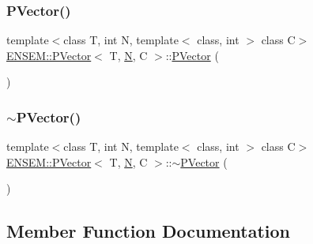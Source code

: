 \mbox{\label{classENSEM_1_1PVector_afc5f971e6ec88789c8205b2e03b1edfd}} 
\subsubsection{\texorpdfstring{PVector()}{PVector()}\hspace{0.1cm}{\footnotesize\ttfamily [2/2]}}
{\footnotesize\ttfamily template$<$class T, int N, template$<$ class, int $>$ class C$>$ \\
\mbox{\hyperlink{classENSEM_1_1PVector}{E\+N\+S\+E\+M\+::\+P\+Vector}}$<$ T, \mbox{\hyperlink{operator__name__util_8cc_a7722c8ecbb62d99aee7ce68b1752f337}{N}}, C $>$\+::\mbox{\hyperlink{classENSEM_1_1PVector}{P\+Vector}} (\begin{DoxyParamCaption}{ }\end{DoxyParamCaption})\hspace{0.3cm}{\ttfamily [inline]}}

\mbox{\label{classENSEM_1_1PVector_a74ba2f55760e8ed1947ef3bb534400b6}} 
\subsubsection{\texorpdfstring{$\sim$PVector()}{~PVector()}\hspace{0.1cm}{\footnotesize\ttfamily [2/2]}}
{\footnotesize\ttfamily template$<$class T, int N, template$<$ class, int $>$ class C$>$ \\
\mbox{\hyperlink{classENSEM_1_1PVector}{E\+N\+S\+E\+M\+::\+P\+Vector}}$<$ T, \mbox{\hyperlink{operator__name__util_8cc_a7722c8ecbb62d99aee7ce68b1752f337}{N}}, C $>$\+::$\sim$\mbox{\hyperlink{classENSEM_1_1PVector}{P\+Vector}} (\begin{DoxyParamCaption}{ }\end{DoxyParamCaption})\hspace{0.3cm}{\ttfamily [inline]}}



\subsection{Member Function Documentation}
\mbox{\label{classENSEM_1_1PVector_a2dec9eb5015ac1a8a261a20c08d9650c}} 
